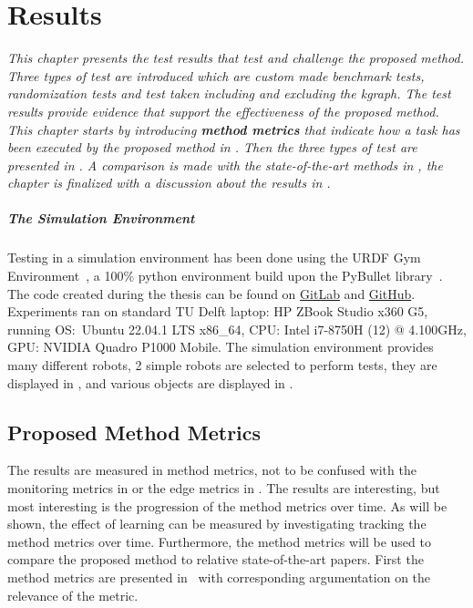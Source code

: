 \chapter{Results}%
\label{chap:results}
\textit{This chapter presents the test results that test and challenge the proposed method. Three types of test are introduced which are custom made benchmark tests, randomization tests and test taken including and excluding the \ac{kgraph}. The test results provide evidence that support the effectiveness of the proposed method. This chapter starts by introducing \textbf{method metrics} that indicate how a task has been executed by the proposed method in . Then the three types of test are presented in . A comparison is made with the state-of-the-art methods in , the chapter is finalized with a discussion about the results in .\bs}

\paragraph{The Simulation Environment}
Testing in a simulation environment has been done using the URDF Gym Environment~\cite{spahn_urdfenvironment_2022}, a 100\% python environment build upon the PyBullet library~\cite{coumans_pybullet_2016}. The code created during the thesis can be found on \href{https://gitlab.tudelft.nl/airlab-delft/msc_projects/msc_gijs_groote}{GitLab} and \href{https://github.com/GijsGroote/semantic-thinking-robot}{GitHub}. Experiments ran on standard TU Delft laptop: HP ZBook Studio x360 G5, running OS:~Ubuntu 22.04.1 LTS x86\_64, CPU: Intel i7-8750H (12) @ 4.100GHz, GPU: NVIDIA Quadro P1000 Mobile.\bs
The simulation environment provides many different robots, 2 simple robots are selected to perform tests, they are displayed in , and various objects are displayed in .

\section{Proposed Method Metrics}%
\label{sec:proposed_method_metrics}
The results are measured in method metrics, not to be confused with the monitoring metrics in  or the edge metrics in . The results are interesting, but most interesting is the progression of the method metrics over time. As will be shown, the effect of learning can be measured by investigating tracking the method metrics over time. Furthermore, the method metrics will be used to compare the proposed method to relative state-of-the-art papers. First the method metrics are presented in~ with corresponding argumentation on the relevance of the metric.\bs

